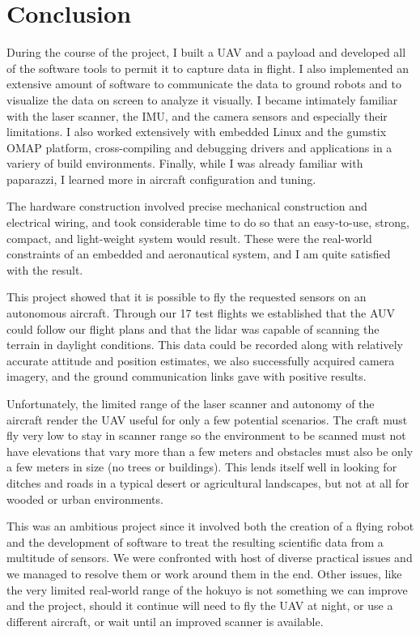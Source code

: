 \documentclass[a4paper,11pt]{report}
\begin{document}
\chapter{Conclusion}

During the course of the project, I built a UAV and a payload and developed all of the software tools to permit it to capture data in flight. I also implemented an extensive amount of software to communicate the data to ground robots and to visualize the data on screen to analyze it visually. I became intimately familiar with the laser scanner, the IMU, and the camera sensors and especially their limitations. I also worked extensively with embedded Linux and the gumstix OMAP platform, cross-compiling and debugging drivers and applications in a variery of build environments. Finally, while I was already familiar with paparazzi, I learned more in aircraft configuration and tuning.

The hardware construction involved precise mechanical construction and electrical wiring, and took considerable time to do so that an easy-to-use, strong, compact, and light-weight system would result. These were the real-world constraints of an embedded and aeronautical system, and I am quite satisfied with the result.

This project showed that it is possible to fly the requested sensors on an autonomous aircraft. Through our 17 test flights we established that the AUV could follow our flight plans and that the lidar was capable of scanning the terrain in daylight conditions. This data could be recorded along with relatively accurate attitude and position estimates, we also successfully acquired camera imagery, and the ground communication links gave with positive results.

Unfortunately, the limited range of the laser scanner and autonomy of the aircraft render the UAV useful for only a few potential scenarios. The craft must fly very low to stay in scanner range so the environment to be scanned must not have elevations that vary more than a few meters and obstacles must also be only a few meters in size (no trees or buildings). This lends itself well in looking for ditches and roads in a typical desert or agricultural landscapes, but not at all for wooded or urban environments.

This was an ambitious project since it involved both the creation of a flying robot and the development of software to treat the resulting scientific data from a multitude of sensors. We were confronted with host of diverse practical issues and we managed to resolve them or work around them in the end. Other issues, like the very limited real-world range of the hokuyo is not something we can improve and the project, should it continue will need to fly the UAV at night, or use a different aircraft, or wait until an improved scanner is available.
\end{document}
